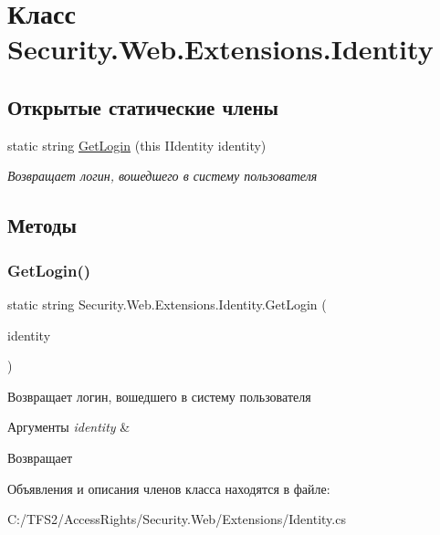 \hypertarget{class_security_1_1_web_1_1_extensions_1_1_identity}{}\section{Класс Security.\+Web.\+Extensions.\+Identity}
\label{class_security_1_1_web_1_1_extensions_1_1_identity}
\subsection*{Открытые статические члены}
\begin{DoxyCompactItemize}
\item 
static string \hyperlink{class_security_1_1_web_1_1_extensions_1_1_identity_ade48dba2925836f9dd6471fb18c40e8e}{Get\+Login} (this I\+Identity identity)
\begin{DoxyCompactList}\small\item\em Возвращает логин, вошедшего в систему пользователя \end{DoxyCompactList}\end{DoxyCompactItemize}


\subsection{Методы}
\mbox{\label{class_security_1_1_web_1_1_extensions_1_1_identity_ade48dba2925836f9dd6471fb18c40e8e}} 
\subsubsection{\texorpdfstring{Get\+Login()}{GetLogin()}}
{\footnotesize\ttfamily static string Security.\+Web.\+Extensions.\+Identity.\+Get\+Login (\begin{DoxyParamCaption}\item[{this I\+Identity}]{identity }\end{DoxyParamCaption})\hspace{0.3cm}{\ttfamily [static]}}



Возвращает логин, вошедшего в систему пользователя 


\begin{DoxyParams}{Аргументы}
{\em identity} & \\
\hline
\end{DoxyParams}
\begin{DoxyReturn}{Возвращает}

\end{DoxyReturn}


Объявления и описания членов класса находятся в файле\+:\begin{DoxyCompactItemize}
\item 
C\+:/\+T\+F\+S2/\+Access\+Rights/\+Security.\+Web/\+Extensions/Identity.\+cs\end{DoxyCompactItemize}
